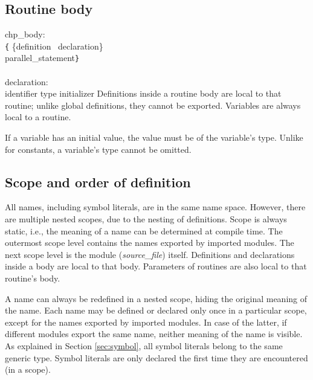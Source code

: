 
\subsection{Routine body}\label{sec:body}

\grammarstart
chp\_body: \\
       \verb|{| \{definition \orbox \ declaration\}\SERIESOPT \\
      \>\qquad parallel\_statement\TSEQOPT \verb|}| \\
 \\
declaration: \\
       identifier\LIST {\tt{}:} type initializer\OPT {\tt{};}
\grammarend
Definitions inside a routine body are local to that routine; unlike
global definitions, they cannot be exported. Variables are always
local to a routine.

If a variable has an initial value, the value must be of the variable's
type. Unlike for constants, a variable's type cannot be omitted.



\subsection{Scope and order of definition}\label{sec:scope}

All names, including symbol literals, are in the same name space.
However, there are multiple nested scopes, due to the nesting of
definitions. Scope is always static, i.e.,
the meaning of a name can be determined at compile time. The outermost
scope level contains the names exported by imported modules. The next
scope level is the module ({\it{}source\_file}) itself. Definitions and
declarations
inside a body are local to that body. Parameters of routines are also
local to that routine's body.

A name can always be redefined in a nested scope, hiding the original
meaning of the name. Each name may be defined or declared only once in
a particular scope, except for the names exported by imported modules.
In case of the latter, if different modules export the same name, neither
meaning of the name is visible. As explained in Section \ref{sec:symbol},
all symbol literals belong to the same generic type. Symbol literals
are only declared the first time they are encountered (in a scope).

